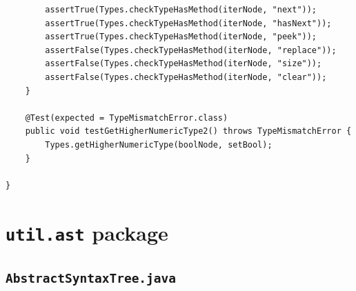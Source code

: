 \documentclass{report}
\begin{document}
\begin{verbatim}
		assertTrue(Types.checkTypeHasMethod(iterNode, "next"));
		assertTrue(Types.checkTypeHasMethod(iterNode, "hasNext"));
		assertTrue(Types.checkTypeHasMethod(iterNode, "peek"));
		assertFalse(Types.checkTypeHasMethod(iterNode, "replace"));
		assertFalse(Types.checkTypeHasMethod(iterNode, "size"));
		assertFalse(Types.checkTypeHasMethod(iterNode, "clear"));
	}
	
	@Test(expected = TypeMismatchError.class)
	public void testGetHigherNumericType2() throws TypeMismatchError {
		Types.getHigherNumericType(boolNode, setBool);
	}

}

\end{verbatim}

\section{\texttt{util.ast} package}

\subsection{\texttt{AbstractSyntaxTree.java}}
\end{document}
